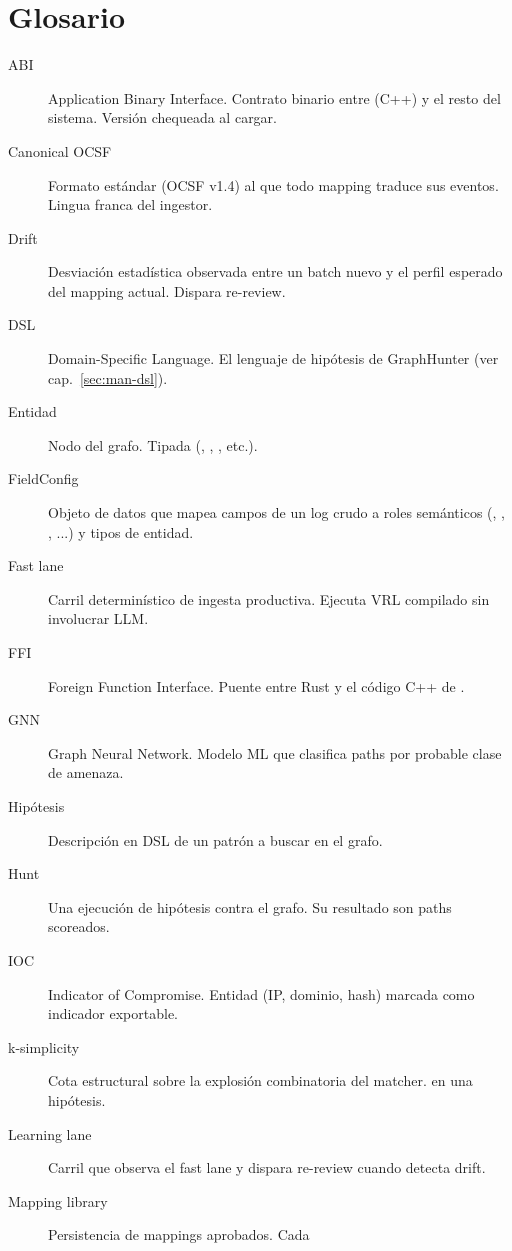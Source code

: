 \chapter{Glosario}
\label{app:man-glosario}

\begin{description}
    \item[ABI] Application Binary Interface. Contrato binario entre
     (C++) y el resto del sistema. Versión
    chequeada al cargar.
    \item[Canonical OCSF] Formato estándar (OCSF v1.4) al que todo
    mapping traduce sus eventos. Lingua franca del ingestor.
    \item[Drift] Desviación estadística observada entre un batch
    nuevo y el perfil esperado del mapping actual. Dispara
    re-review.
    \item[DSL] Domain-Specific Language. El lenguaje de hipótesis
    de GraphHunter (ver cap.~\ref{sec:man-dsl}).
    \item[Entidad] Nodo del grafo. Tipada (,
    , , etc.).
    \item[FieldConfig] Objeto de datos que mapea campos de un log
    crudo a roles semánticos (, ,
    , ...) y tipos de entidad.
    \item[Fast lane] Carril determinístico de ingesta productiva.
    Ejecuta VRL compilado sin involucrar LLM.
    \item[FFI] Foreign Function Interface. Puente entre Rust y el
    código C++ de .
    \item[GNN] Graph Neural Network. Modelo ML que clasifica paths
    por probable clase de amenaza.
    \item[Hipótesis] Descripción en DSL de un patrón a buscar en
    el grafo.
    \item[Hunt] Una ejecución de hipótesis contra el grafo. Su
    resultado son paths scoreados.
    \item[IOC] Indicator of Compromise. Entidad (IP, dominio, hash)
    marcada como indicador exportable.
    \item[k-simplicity] Cota estructural sobre la explosión
    combinatoria del matcher.  en una hipótesis.
    \item[Learning lane] Carril que observa el fast lane y dispara
    re-review cuando detecta drift.
    \item[Mapping library] Persistencia de mappings aprobados. Cada

\end{description}
